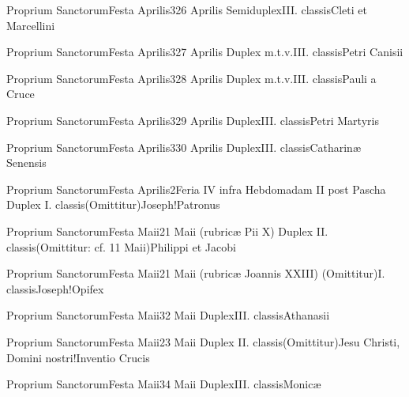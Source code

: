 \documentclass[psalterium-feriale.tex]{subfiles}
\begin{document}
	{Proprium Sanctorum}{Festa Aprilis}{3}{26 Aprilis}
	{Semiduplex}{III. classis}{Cleti et Marcellini}
	{}
	{}

	{Proprium Sanctorum}{Festa Aprilis}{3}{27 Aprilis}
	{Duplex m.t.v.}{III. classis}{Petri Canisii}
	{}
	{}

	{Proprium Sanctorum}{Festa Aprilis}{3}{28 Aprilis}
	{Duplex m.t.v.}{III. classis}{Pauli a Cruce}
	{}
	{}

	{Proprium Sanctorum}{Festa Aprilis}{3}{29 Aprilis}
	{Duplex}{III. classis}{Petri Martyris}
	{}
	{}

	{Proprium Sanctorum}{Festa Aprilis}{3}{30 Aprilis}
	{Duplex}{III. classis}{Catharinæ Senensis}
	{}
	{}

	{Proprium Sanctorum}{Festa Aprilis}{2}{Feria IV infra Hebdomadam II post Pascha}
	{Duplex I. classis}{(Omittitur)}{Joseph!Patronus}
	{}
	{}
\psalmodiapropria
{}

	{Proprium Sanctorum}{Festa Maii}{2}{1 Maii (rubricæ Pii X)}
	{Duplex II. classis}{(Omittitur: cf. 11 Maii)}{Philippi et Jacobi}
	{}
	{}
\psalmodiapropria

	{Proprium Sanctorum}{Festa Maii}{2}{1 Maii (rubricæ Joannis XXIII)}
	{(Omittitur)}{I. classis}{Joseph!Opifex}
	{}
	{}
\psalmodiapropria

	{Proprium Sanctorum}{Festa Maii}{3}{2 Maii}
	{Duplex}{III. classis}{Athanasii}
	{}
	{}

	{Proprium Sanctorum}{Festa Maii}{2}{3 Maii}
	{Duplex II. classis}{(Omittitur)}{Jesu Christi, Domini nostri!Inventio Crucis}
	{}
	{}
\psalmodiapropria

	{Proprium Sanctorum}{Festa Maii}{3}{4 Maii}
	{Duplex}{III. classis}{Monicæ}
	{}
	{}
\end{document}
